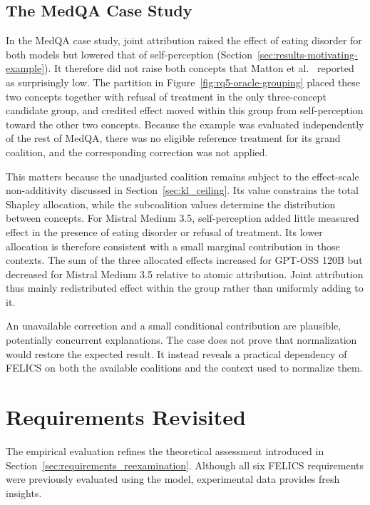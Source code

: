 \subsection{The MedQA Case Study}
\label{sec:motivating_example_discussion}

In the MedQA case study, joint attribution raised the effect of eating disorder for both models but lowered that of self-perception (Section~\ref{sec:results-motivating-example}). It therefore did not raise both concepts that Matton et al.~\cite{mattonWalkTalkMeasuring2024} reported as surprisingly low. The partition in Figure~\ref{fig:rq5-oracle-grouping} placed these two concepts together with refusal of treatment in the only three-concept candidate group, and credited effect moved within this group from self-perception toward the other two concepts. Because the example was evaluated independently of the rest of MedQA, there was no eligible reference treatment for its grand coalition, and the corresponding correction was not applied.

This matters because the unadjusted coalition remains subject to the effect-scale non-additivity discussed in Section~\ref{sec:kl_ceiling}. Its value constrains the total Shapley allocation, while the subcoalition values determine the distribution between concepts. For Mistral Medium 3.5, self-perception added little measured effect in the presence of eating disorder or refusal of treatment. Its lower allocation is therefore consistent with a small marginal contribution in those contexts. The sum of the three allocated effects increased for GPT-OSS 120B but decreased for Mistral Medium 3.5 relative to atomic attribution. Joint attribution thus mainly redistributed effect within the group rather than uniformly adding to it.

An unavailable correction and a small conditional contribution are plausible, potentially concurrent explanations. The case does not prove that normalization would restore the expected result. It instead reveals a practical dependency of FELICS on both the available coalitions and the context used to normalize them.

\section{Requirements Revisited}
\label{sec:requirements_revisited}
The empirical evaluation refines the theoretical assessment introduced in Section~\ref{sec:requirements_reexamination}. Although all six FELICS requirements were previously evaluated using the model, experimental data provides fresh insights.

